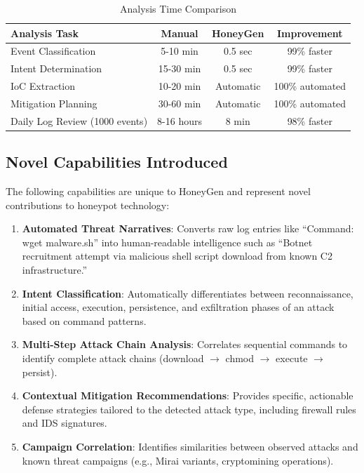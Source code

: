 \documentclass[12pt,a4paper]{report}
\begin{document}
\begin{table}[h]
\centering
\caption{Analysis Time Comparison}
\label{tab:time_comparison}
\begin{tabular}{|l|c|c|c|}
\hline
\textbf{Analysis Task} & \textbf{Manual} & \textbf{HoneyGen} & \textbf{Improvement} \\
\hline
Event Classification & 5-10 min & 0.5 sec & 99\% faster \\
\hline
Intent Determination & 15-30 min & 0.5 sec & 99\% faster \\
\hline
IoC Extraction & 10-20 min & Automatic & 100\% automated \\
\hline
Mitigation Planning & 30-60 min & Automatic & 100\% automated \\
\hline
Daily Log Review (1000 events) & 8-16 hours & 8 min & 98\% faster \\
\hline
\end{tabular}
\end{table}

\subsection{Novel Capabilities Introduced}

The following capabilities are unique to HoneyGen and represent novel contributions to honeypot technology:

\begin{enumerate}
\item \textbf{Automated Threat Narratives}: Converts raw log entries like ``Command: wget malware.sh'' into human-readable intelligence such as ``Botnet recruitment attempt via malicious shell script download from known C2 infrastructure.''

\item \textbf{Intent Classification}: Automatically differentiates between reconnaissance, initial access, execution, persistence, and exfiltration phases of an attack based on command patterns.

\item \textbf{Multi-Step Attack Chain Analysis}: Correlates sequential commands to identify complete attack chains (download $\rightarrow$ chmod $\rightarrow$ execute $\rightarrow$ persist).

\item \textbf{Contextual Mitigation Recommendations}: Provides specific, actionable defense strategies tailored to the detected attack type, including firewall rules and IDS signatures.

\item \textbf{Campaign Correlation}: Identifies similarities between observed attacks and known threat campaigns (e.g., Mirai variants, cryptomining operations).
\end{enumerate}
\end{document}
